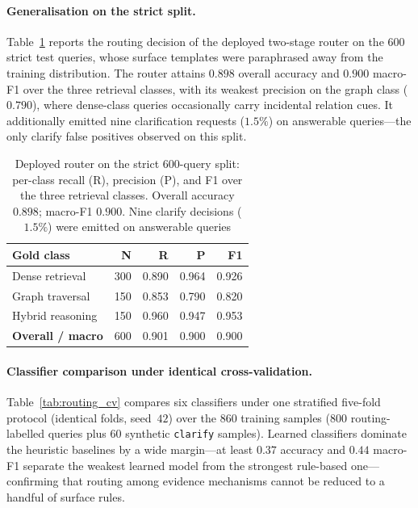 \paragraph{Generalisation on the strict split.}
Table~\ref{tab:routing_strict} reports the routing decision of the deployed
two-stage router on the $600$ strict test queries, whose surface templates
were paraphrased away from the training distribution. The router attains
$0.898$ overall accuracy and $0.900$ macro-F1 over the three retrieval
classes, with its weakest precision on the graph class ($0.790$), where
dense-class queries occasionally carry incidental relation cues. It
additionally emitted nine clarification requests ($1.5\%$) on answerable
queries---the only clarify false positives observed on this split.

\begin{table}[!htbp]
\centering
\caption{Deployed router on the strict $600$-query split: per-class recall
(R), precision (P), and F1 over the three retrieval classes. Overall accuracy
$0.898$; macro-F1 $0.900$. Nine clarify decisions ($1.5\%$) were emitted on
answerable queries}\label{tab:routing_strict}
\begin{tabular}{lrrrr}
\toprule
\textbf{Gold class} & \textbf{N} & \textbf{R} & \textbf{P} & \textbf{F1} \\
\midrule
Dense retrieval  & 300 & 0.890 & 0.964 & 0.926 \\
Graph traversal  & 150 & 0.853 & 0.790 & 0.820 \\
Hybrid reasoning & 150 & 0.960 & 0.947 & 0.953 \\
\midrule
\textbf{Overall / macro} & 600 & 0.901 & 0.900 & 0.900 \\
\bottomrule
\end{tabular}
\end{table}

\paragraph{Classifier comparison under identical cross-validation.}
Table~\ref{tab:routing_cv} compares six classifiers under one stratified
five-fold protocol (identical folds, seed~$42$) over the $860$ training
samples ($800$ routing-labelled queries plus $60$ synthetic \texttt{clarify}
samples). Learned classifiers dominate the heuristic baselines by a wide
margin---at least $0.37$ accuracy and $0.44$ macro-F1 separate the weakest
learned model from the strongest rule-based one---confirming that routing
among evidence mechanisms cannot be reduced to a handful of surface rules.


